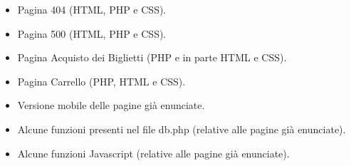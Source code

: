 \begin{itemize}
        \begin{itemize}
            \item Pagina 404 (HTML, PHP e CSS).
            \item Pagina 500 (HTML, PHP e CSS).
            \item Pagina Acquisto dei Biglietti (PHP e in parte HTML e CSS).
            \item Pagina Carrello (PHP, HTML e CSS).
            \item Versione mobile delle pagine già enunciate.
            \item Alcune funzioni presenti nel file db.php (relative alle pagine già enunciate).
            \item Alcune funzioni Javascript (relative alle pagine già enunciate).
        \end{itemize}
\end{itemize}
